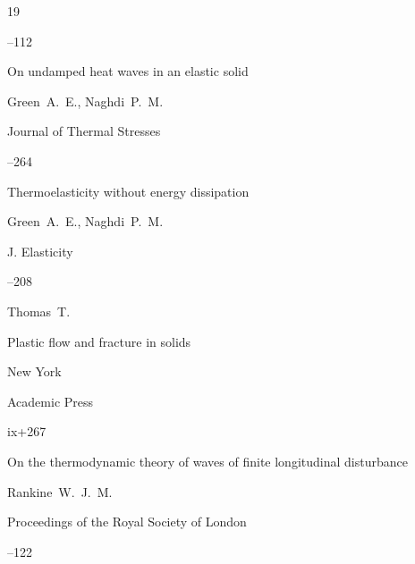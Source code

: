 \begin{thebibliography}{19}



--112





\paper On undamped heat waves in an elastic solid

\by Green~A.~E., Naghdi~P.~M.

\jour Journal of Thermal Stresses




--264





\paper Thermoelasticity without energy dissipation

\by Green~A.~E., Naghdi~P.~M.

\jour J. Elasticity




--208





\by Thomas~T.

\book Plastic flow and fracture in solids

\publaddr New York

\publ Academic Press


\totalpages ix+267




\paper On the thermodynamic theory of waves of finite longitudinal disturbance

\by Rankine~W.~J.~M.

\jour Proceedings of the Royal Society of London



--122


\end{thebibliography}
